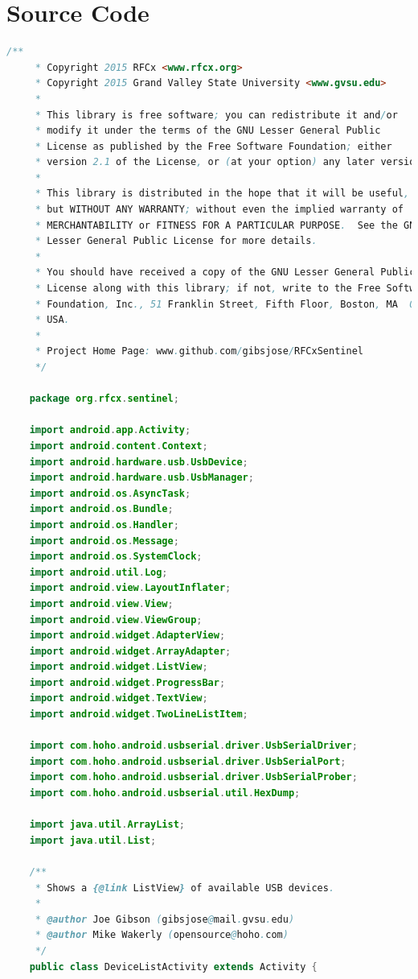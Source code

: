\documentclass{article}
\numberwithin{figure}{section}
\numberwithin{equation}{section}
\begin{document}
{\section{Source Code} \label{sect:appendixF}
\begin{lstlisting}[language=Java,label=lst:devicelist,caption=DeviceListActivity.java]
    /**
     * Copyright 2015 RFCx <www.rfcx.org>
     * Copyright 2015 Grand Valley State University <www.gvsu.edu>
     *
     * This library is free software; you can redistribute it and/or
     * modify it under the terms of the GNU Lesser General Public
     * License as published by the Free Software Foundation; either
     * version 2.1 of the License, or (at your option) any later version.
     *
     * This library is distributed in the hope that it will be useful,
     * but WITHOUT ANY WARRANTY; without even the implied warranty of
     * MERCHANTABILITY or FITNESS FOR A PARTICULAR PURPOSE.  See the GNU
     * Lesser General Public License for more details.
     *
     * You should have received a copy of the GNU Lesser General Public
     * License along with this library; if not, write to the Free Software
     * Foundation, Inc., 51 Franklin Street, Fifth Floor, Boston, MA  02110-1301,
     * USA.
     *
     * Project Home Page: www.github.com/gibsjose/RFCxSentinel
     */

    package org.rfcx.sentinel;

    import android.app.Activity;
    import android.content.Context;
    import android.hardware.usb.UsbDevice;
    import android.hardware.usb.UsbManager;
    import android.os.AsyncTask;
    import android.os.Bundle;
    import android.os.Handler;
    import android.os.Message;
    import android.os.SystemClock;
    import android.util.Log;
    import android.view.LayoutInflater;
    import android.view.View;
    import android.view.ViewGroup;
    import android.widget.AdapterView;
    import android.widget.ArrayAdapter;
    import android.widget.ListView;
    import android.widget.ProgressBar;
    import android.widget.TextView;
    import android.widget.TwoLineListItem;

    import com.hoho.android.usbserial.driver.UsbSerialDriver;
    import com.hoho.android.usbserial.driver.UsbSerialPort;
    import com.hoho.android.usbserial.driver.UsbSerialProber;
    import com.hoho.android.usbserial.util.HexDump;

    import java.util.ArrayList;
    import java.util.List;

    /**
     * Shows a {@link ListView} of available USB devices.
     *
     * @author Joe Gibson (gibsjose@mail.gvsu.edu)
     * @author Mike Wakerly (opensource@hoho.com)
     */
    public class DeviceListActivity extends Activity {


\end{lstlisting}}
\end{document}
